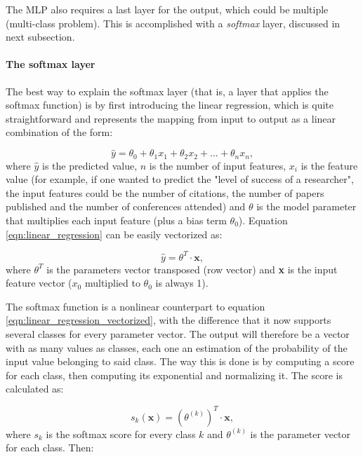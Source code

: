 \documentclass[../main.tex]{subfiles}
\begin{document}
The MLP also requires a last layer for the output, which could be multiple (multi-class problem). This is accomplished with a \textit{softmax} layer, discussed in next subsection.

\paragraph{The softmax layer}
The best way to explain the softmax layer (that is, a layer that applies the softmax function) is by first introducing the linear regression, which is quite straightforward and represents the mapping from input to output as a linear combination of the form:

\begin{equation} \label{eqn:linear_regression}
    \hat{y} = \theta_0 + \theta_1 x_1 + \theta_2 x_2 + ... + \theta_n x_n,
\end{equation}
where $\hat{y}$ is the predicted value, $n$ is the number of input features, $x_i$ is the feature value (for example, if one wanted to predict the "level of success of a researcher", the input features could be the number of citations, the number of papers published and the number of conferences attended) and $\theta$ is the model parameter that multiplies each input feature (plus a bias term $ \theta_0 $). Equation \ref{eqn:linear_regression} can be easily vectorized as:

\begin{equation} \label{eqn:linear_regression_vectorized}
    \hat{y} = \theta^T \cdot \textbf{x},
\end{equation}
where $\theta^T$ is the parameters vector transposed (row vector) and \textbf{x} is the input feature vector ($x_0$ multiplied to $\theta_0$ is always 1).

The softmax function is a nonlinear counterpart to equation \ref{eqn:linear_regression_vectorized}, with the difference that it now supports several classes for every parameter vector. The output will therefore be a vector with as many values as classes, each one an estimation of the probability of the input value belonging to said class. The way this is done is by computing a score for each class, then computing its exponential and normalizing it. The score is calculated as:

\begin{equation} \label{eqn:softmax_score}
    s_{k}(\textbf{x}) = (\theta^{(k)})^T \cdot \textbf{x},
\end{equation}
where $s_k$ is the softmax score for every class $k$ and $\theta^(k)$ is the parameter vector for each class. Then:
\end{document}

